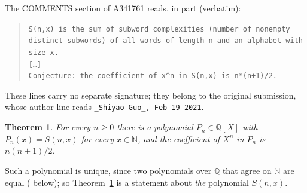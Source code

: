 \documentclass[11pt]{amsart}
\theoremstyle{plain}
\newtheorem{theorem}{Theorem}
\theoremstyle{definition}
\newcommand{\N}{\mathbb{N}}
\newcommand{\Q}{\mathbb{Q}}
\begin{document}
The COMMENTS section of A341761 \cite{A341761} reads, in part (verbatim):
\begin{quote}
{\small\raggedright\texttt{S(n,x) is the sum of subword complexities (number of nonempty distinct subwords) of all words of length n and an alphabet with size x.}\\
\texttt{[\dots]}\\
\texttt{Conjecture: the coefficient of x\^{}n in S(n,x) is n*(n+1)/2.}\par}
\end{quote}
These lines carry no separate signature; they belong to the original submission, whose author line reads \texttt{\_Shiyao Guo\_, Feb 19 2021}.

\begin{theorem}\label{thm:main}
For every $n\ge0$ there is a polynomial $P_n\in\Q[X]$ with $P_n(x)=S(n,x)$ for every $x\in\N$, and the coefficient of $X^n$ in $P_n$ is $n(n+1)/2$.
\end{theorem}
Such a polynomial is unique, since two polynomials over $\Q$ that agree on $\N$ are equal ( below); so Theorem~\ref{thm:main} is a statement about \emph{the} polynomial $S(n,x)$.
\end{document}
